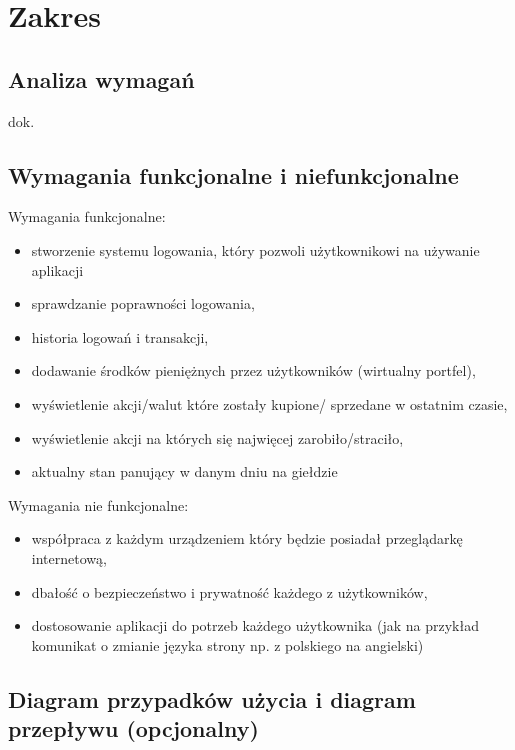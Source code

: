 \documentclass[12pt,a4paper]{article}
\begin{document}
\section{Zakres}
\subsection{Analiza wymagań}

dok.

\subsection{Wymagania funkcjonalne i niefunkcjonalne}

Wymagania funkcjonalne:
\begin{itemize} 
  \item stworzenie systemu logowania, który pozwoli użytkownikowi na używanie aplikacji
  \item sprawdzanie poprawności logowania,
  \item historia logowań i transakcji, 
  \item dodawanie środków pieniężnych przez użytkowników (wirtualny portfel),
  \item wyświetlenie akcji/walut które zostały kupione/ sprzedane w ostatnim czasie,
  \item wyświetlenie akcji na których się najwięcej zarobiło/straciło,
  \item aktualny stan panujący w danym dniu na giełdzie 
\end{itemize}

Wymagania nie funkcjonalne:
\begin{itemize}
  \item współpraca z każdym urządzeniem który będzie posiadał przeglądarkę internetową,
  \item dbałość o bezpieczeństwo i prywatność każdego z użytkowników,
  \item dostosowanie aplikacji do potrzeb każdego użytkownika (jak na przykład komunikat o zmianie języka strony np. z polskiego na angielski)
\end{itemize}

\newpage

\subsection{Diagram przypadków użycia i diagram przepływu (opcjonalny)}
\end{document}
